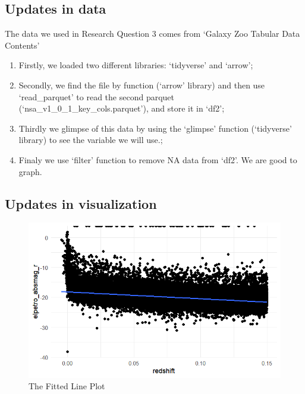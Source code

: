 \documentclass[12pt]{article}
\begin{document}
\subsection{Updates in data}
 The data we used in Research Question 3 comes from `Galaxy Zoo Tabular Data Contents'
 \begin{enumerate}
 	\item  Firstly, we loaded two different libraries: `tidyverse' and `arrow';
 	\item Secondly, we find the file by function (`arrow' library) and then use `read\_parquet' to read the second parquet (`nsa\_v1\_0\_1\_key\_cols.parquet'), and store it in `df2';
 	\item Thirdly we glimpse of this data by using the `glimpse' function (`tidyverse' library) to see the variable we will use.;
 	\item Finaly we use `filter' function to remove NA data from `df2'. We are good to graph.
 \end{enumerate}
 
\subsection{Updates in visualization}
\begin{figure}[h]
	\centering
	\includegraphics{Graphs/5.png}
	\caption{The Fitted Line Plot}
\end{figure}
\end{document}
